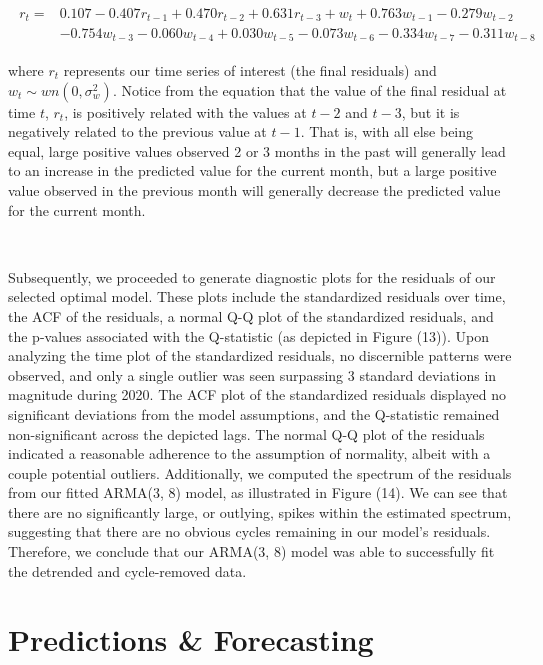 \documentclass[10pt]{article}
\begin{document}
\begin{align}
    \begin{split}
        r_t = {}& 0.107 - 0.407r_{t-1} + 0.470r_{t-2} + 0.631r_{t-3} + w_{t} + 0.763w_{t-1} - 0.279w_{t-2} \\
                &  - 0.754w_{t-3} - 0.060w_{t-4} + 0.030w_{t-5} - 0.073w_{t-6} - 0.334w_{t-7} - 0.311w_{t-8} \nonumber
    \end{split}
\end{align}

where $r_t$ represents our time series of interest (the final residuals) and $w_t \sim wn(0, \sigma_w^2)$. Notice from the equation that the value of the final residual at time $t$, $r_t$, is positively related with the values at $t-2$ and $t-3$, but it is negatively related to the previous value at $t-1$. That is, with all else being equal, large positive values observed 2 or 3 months in the past will generally lead to an increase in the predicted value for the current month, but a large positive value observed in the previous month will generally decrease the predicted value for the current month.

\

Subsequently, we proceeded to generate diagnostic plots for the residuals of our selected optimal model. These plots include the standardized residuals over time, the ACF of the residuals, a normal Q-Q plot of the standardized residuals, and the p-values associated with the Q-statistic (as depicted in Figure (13)). Upon analyzing the time plot of the standardized residuals, no discernible patterns were observed, and only a single outlier was seen surpassing 3 standard deviations in magnitude during 2020. The ACF plot of the standardized residuals displayed no significant deviations from the model assumptions, and the Q-statistic remained non-significant across the depicted lags. The normal Q-Q plot of the residuals indicated a reasonable adherence to the assumption of normality, albeit with a couple potential outliers. Additionally, we computed the spectrum of the residuals from our fitted ARMA(3, 8) model, as illustrated in Figure (14). We can see that there are no significantly large, or outlying, spikes within the estimated spectrum, suggesting that there are no obvious cycles remaining in our model's residuals. Therefore, we conclude that our ARMA(3, 8) model was able to successfully fit the detrended and cycle-removed data.

\section*{Predictions \& Forecasting}
\end{document}

